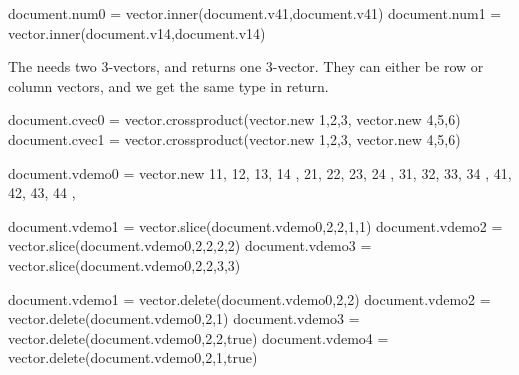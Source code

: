 \startbuffer
\startluacode
document.num0 = vector.inner(document.v41,document.v41)
document.num1 = vector.inner(document.v14,document.v14)
\stopluacode
\stopbuffer

\typebuffer[option=TEX] \getbuffer

\startlinecorrection
{} {}
    {} {}
\stopcombination
\stoplinecorrection

The  needs two 3-vectors, and returns one 3-vector. They can
either be row or column vectors, and we get the same type in return.

\startbuffer
\startluacode
document.cvec0 = vector.crossproduct(vector.new {{1,2,3}},     vector.new {{4,5,6}})
document.cvec1 = vector.crossproduct(vector.new {{1},{2},{3}}, vector.new {{4},{5},{6}})
\stopluacode
\stopbuffer

\typebuffer[option=TEX] \getbuffer

\startlinecorrection
{} {}
    {} {}
\stopcombination
\stoplinecorrection


\startbuffer
\startluacode
document.vdemo0 = vector.new {
    { 11, 12, 13, 14 },
    { 21, 22, 23, 24 },
    { 31, 32, 33, 34 },
    { 41, 42, 43, 44 },
}

document.vdemo1 = vector.slice(document.vdemo0,2,2,1,1)
document.vdemo2 = vector.slice(document.vdemo0,2,2,2,2)
document.vdemo3 = vector.slice(document.vdemo0,2,2,3,3)
\stopluacode
\stopbuffer

\typebuffer[option=TEX] \getbuffer

\startlinecorrection
{} {}
    {} {}
    {} {}
    {} {}
\stopcombination
\stoplinecorrection

\startbuffer
\startluacode
document.vdemo1 = vector.delete(document.vdemo0,2,2)
document.vdemo2 = vector.delete(document.vdemo0,2,1)
document.vdemo3 = vector.delete(document.vdemo0,2,2,true)
document.vdemo4 = vector.delete(document.vdemo0,2,1,true)
\stopluacode
\stopbuffer

\typebuffer[option=TEX] \getbuffer

